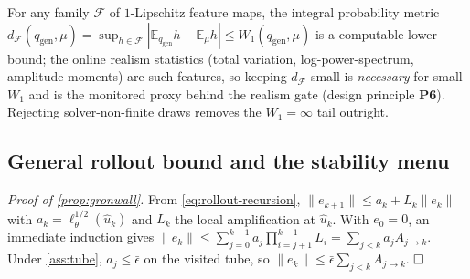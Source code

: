 \documentclass{article}
\theoremstyle{plain}
\theoremstyle{definition}
\theoremstyle{remark}
\newcommand{\E}{\mathbb{E}}
\newcommand{\state}{u}
\newcommand{\lossf}{\ell_\theta}
\newcommand{\qgen}{q_{\mathrm{gen}}}
\begin{document}
For any family $\mathcal F$ of $1$-Lipschitz feature maps, the integral probability metric
$d_{\mathcal F}(\qgen,\mu)=\sup_{h\in\mathcal F}|\E_{\qgen}h-\E_\mu h|\le W_1(\qgen,\mu)$ is a computable
lower bound; the online realism statistics (total variation, log-power-spectrum, amplitude moments) are
such features, so keeping $d_{\mathcal F}$ small is \emph{necessary} for small $W_1$ and is the monitored
proxy behind the realism gate (design principle \textbf{P6}). Rejecting solver-non-finite draws removes the
$W_1=\infty$ tail outright.

\subsection{General rollout bound and the stability menu}\label{app:regimes}
\emph{Proof of \cref{prop:gronwall}.} From \eqref{eq:rollout-recursion},
$\|e_{k+1}\|\le a_k+L_k\|e_k\|$ with $a_k=\lossf^{1/2}(\hat\state_k)$ and $L_k$ the local amplification at
$\hat\state_k$. With $e_0=0$, an immediate induction gives
$\|e_k\|\le\sum_{j=0}^{k-1}a_j\prod_{i=j+1}^{k-1}L_i=\sum_{j<k}a_j A_{j\to k}$. Under \cref{ass:tube},
$a_j\le\bar\epsilon$ on the visited tube, so $\|e_k\|\le\bar\epsilon\sum_{j<k}A_{j\to k}$. $\hfill\square$
\end{document}

